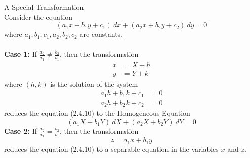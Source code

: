 \begin{theorem}{A Special Transformation}{}
    \\Consider the equation
    \begin{equation}
        (a_1x + b_1y + c_1) \: d{x} + (a_2x + b_2y + c_2) \: d{y} = 0
    \end{equation}
    where $a_1, b_1, c_1, a_2, b_2, c_2$ are constants. \\~\\
    \textbf{Case 1:} If $\frac{a_2}{a_1} \neq \frac{b_2}{b_1}$, then the transformation
    \begin{align*}
        x &= X + h \\
        y &= Y + k
    \end{align*}
    where $(h, k)$ is the solution of the system
    \begin{align*}
        a_1h + b_1k + c_1 &= 0 \\
        a_2h + b_2k + c_2 &= 0
    \end{align*}
    reduces the equation (2.4.10) to the Homogeneous Equation
    \begin{equation}
        (a_1X + b_1Y) \: d{X} + (a_2X + b_2Y) \: d{Y} = 0
    \end{equation}
    \textbf{Case 2:} If $\frac{a_2}{a_1} = \frac{b_2}{b_1}$, then the transformation \[
        z = a_1x + b_1y
    \] reduces the equation (2.4.10) to a separable equation in the variables $x$ and $z$.
\end{theorem}

